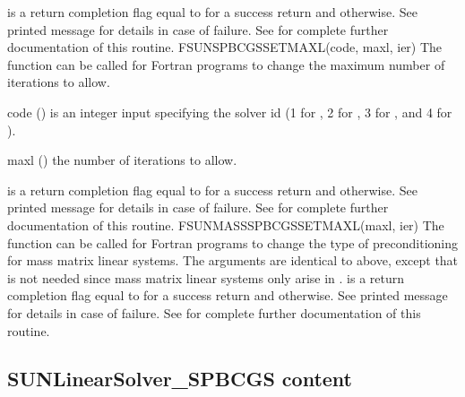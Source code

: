 {
   is a  return completion flag equal to  for a success
  return and  otherwise. See printed message for details in case
  of failure.
}
{
  See  for complete further documentation of
  this routine.
}
%
%
{
  FSUNSPBCGSSETMAXL(code, maxl, ier)
}
{
  The function  can be called for Fortran
  programs to change the maximum number of iterations to allow.
}
{
  \begin{args}[maxl]
  \item[code] ()
    is an integer input specifying the solver id (1 for {\cvode}, 2
    for {\ida}, 3 for {\kinsol}, and 4 for {\arkode}).
  \item[maxl] ()
    the number of iterations to allow.
  \end{args}
}
{
   is a  return completion flag equal to  for a success
  return and  otherwise. See printed message for details in case
  of failure.
}
{
  See  for complete further
  documentation of this routine.
}
%
%
{
  FSUNMASSSPBCGSSETMAXL(maxl, ier)
}
{
  The function  can be called for Fortran
  programs to change the type of preconditioning for mass matrix
  linear systems.
}
{
  The arguments are identical to  above, except that
   is not needed since mass matrix linear systems only arise
  in {\arkode}.
}
{
   is a  return completion flag equal to  for a success
  return and  otherwise. See printed message for details in case
  of failure.
}
{
  See  for complete further
  documentation of this routine.
}
%
%

\subsection{SUNLinearSolver\_SPBCGS content}
\label{ss:sunlinsol_spbcgs_content}

